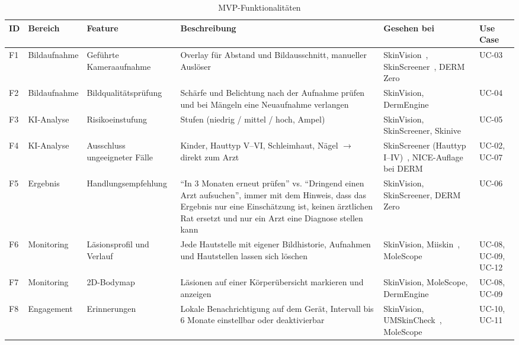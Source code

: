 \begin{table}[htbp]
\caption{MVP-Funktionalitäten}
\label{tab:mvp-features}
\footnotesize
\renewcommand{\arraystretch}{1.15}
\begin{tabularx}{\textwidth}{@{}l l >{\RaggedRight\arraybackslash}p{2.9cm} >{\RaggedRight\arraybackslash}X >{\RaggedRight\arraybackslash}p{2.2cm} >{\RaggedRight\arraybackslash}p{1.7cm}@{}}
\toprule
\textbf{ID} & \textbf{Bereich} & \textbf{Feature} & \textbf{Beschreibung} & \textbf{Gesehen bei} & \textbf{Use Case} \\
\midrule
F1 & Bildaufnahme & Geführte Kameraaufnahme & Overlay für Abstand und Bildausschnitt, manueller Auslöser & SkinVision~\cite{app-skinvision}, SkinScreener~\cite{app-skinscreener}, DERM Zero~\cite{app-dermzero} & UC-03 \\
F2 & Bildaufnahme & Bildqualitätsprüfung & Schärfe und Belichtung nach der Aufnahme prüfen und bei Mängeln eine Neuaufnahme verlangen & SkinVision, DermEngine~\cite{app-dermengine} & UC-04 \\
F3 & KI-Analyse & Risikoeinstufung & 3 Stufen (niedrig / mittel / hoch, Ampel) & SkinVision, SkinScreener, Skinive~\cite{app-skinive} & UC-05 \\
F4 & KI-Analyse & Ausschluss ungeeigneter Fälle & Kinder, Hauttyp V--VI, Schleimhaut, Nägel $\rightarrow$ direkt zum Arzt & SkinScreener (Hauttyp I--IV)~\cite{skinscreener-ifu}, NICE-Auflage~\cite{nice-htg746} bei DERM~\cite{app-derm} & UC-02, UC-07 \\
F5 & Ergebnis & Handlungsempfehlung & \enquote{In 3 Monaten erneut prüfen} vs. \enquote{Dringend einen Arzt aufsuchen}, immer mit dem Hinweis, dass das Ergebnis nur eine Einschätzung ist, keinen ärztlichen Rat ersetzt und nur ein Arzt eine Diagnose stellen kann & SkinVision, SkinScreener, DERM Zero & UC-06 \\
F6 & Monitoring & Läsionsprofil und Verlauf & Jede Hautstelle mit eigener Bildhistorie, Aufnahmen und Hautstellen lassen sich löschen & SkinVision, Miiskin~\cite{app-miiskin}, MoleScope~\cite{app-molescope} & UC-08, UC-09, UC-12 \\
F7 & Monitoring & 2D-Bodymap & Läsionen auf einer Körperübersicht markieren und anzeigen & SkinVision, MoleScope, DermEngine & UC-08, UC-09 \\
F8 & Engagement & Erinnerungen & Lokale Benachrichtigung auf dem Gerät, Intervall bis 6 Monate einstellbar oder deaktivierbar & SkinVision, UMSkinCheck~\cite{app-umskincheck}, MoleScope & UC-10, UC-11 \\
\bottomrule
\end{tabularx}
\end{table}

